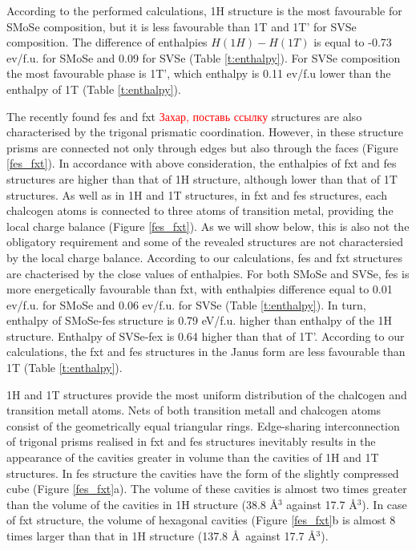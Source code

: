 \documentclass[a4paperm]{article}
\begin{document}
According to the performed calculations, 1H structure is the most favourable for SMoSe composition, but it is less favourable than 1T and 1T' for SVSe composition.
The difference of enthalpies $H(1H)-H(1T)$ is equal to -0.73 ev/f.u. for SMoSe and 0.09 for SVSe (Table \ref{t:enthalpy}).
For SVSe composition the most favourable phase is 1T', which enthalpy is 0.11 ev/f.u lower than the enthalpy of 1T (Table \ref{t:enthalpy}). 

The recently found fes and fxt \cite{} \textcolor{red}{Захар, поставь ссылку} structures are also characterised by the trigonal prismatic coordination.
However, in these structure prisms are connected not only through edges but also through the faces (Figure \ref{fes_fxt}).
In accordance with above consideration, the enthalpies of fxt and fes structures are higher than that of 1H structure, although lower than that of 1T structures.
As well as in 1H and 1T structures, in fxt and fes structures,  each chalcogen atoms is connected to three atoms of transition metal, providing the local charge balance (Figure \ref{fes_fxt}).
As we will show below, this is also not the obligatory requirement and some of the revealed structures are not charactersied by the local charge balance.
According to our calculations, fes and fxt structures are chacterised by the close values of enthalpies.
For both SMoSe and SVSe, fes is more energetically favourable than fxt, with enthalpies difference equal to 0.01 ev/f.u. for SMoSe and 0.06 ev/f.u. for SVSe (Table \ref{t:enthalpy}).
In turn, enthalpy of SMoSe-fes structure is 0.79 eV/f.u. higher than enthalpy of the 1H structure.
Enthalpy of SVSe-fex is 0.64 higher than that of 1T'.
According to our calculations, the fxt and fes structures in the Janus form are less favourable than 1T (Table \ref{t:enthalpy}).

1H and 1T structures provide the most uniform distribution of the chalсogen and transition metall atoms.
Nets of  both transition metall and chalcogen atoms consist of the geometrically equal triangular rings.
Edge-sharing interconnection of trigonal prisms realised in fxt and fes structures inevitably results in the appearance of the cavities greater in volume than the cavities of 1H and 1T structures. 
In fes structure the cavities have the form of the slightly compressed cube (Figure \ref{fes_fxt}a).
The volume of these cavities is almost two times greater than the volume of the cavities in 1H structure (38.8 \AA$^3$ against 17.7 \AA$^3$).
In case of fxt structure, the volume of hexagonal cavities (Figure \ref{fes_fxt}b is almost 8 times larger than that in 1H structure (137.8 \AA\ against 17.7 \AA$^3$).
\end{document}
